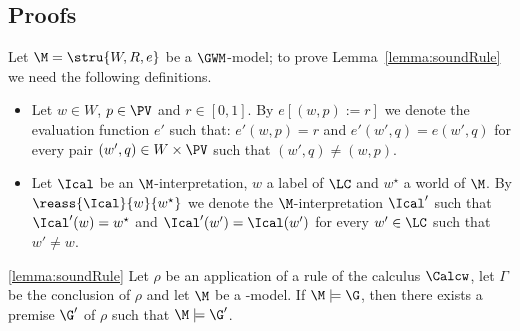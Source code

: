 \subsection{Proofs}\label{app:proofs}

Let $\M=\stru{W,R,e}$ be a $\GWM$-model;
to prove Lemma~\ref{lemma:soundRule} we need the following definitions.
\begin{itemize}
\item Let $w\in W$, $p\in\PV$ and
  $r\in[0,1]$. By  $e[(w,p):=r]$ we denote the evaluation function
  $e'$ such that: $e'(w,p)=r$ and $e'(w',q)=e(w',q)$ for every pair
  $(w',q)\in W\times\PV$ such that $(w',q)\neq(w,p)$.

\item Let $\Ical$ be an $\M$-interpretation,  $w$  a label of
  $\LC$ and $w^\star$ a world of $\M$.  By $\reass{\Ical}{w}{w^\star}$
  we denote the $\M$-interpretation $\Ical'$ such that $\Ical'(w) =
  w^\star$ and $\Ical'(w')= \Ical(w')$ for every $w'\in \LC$ such that
  $w'\neq w$.
\end{itemize}


\begin{lemmaref}{\ref{lemma:soundRule}}
  Let $\rho$ be an application of a rule of the calculus $\Calcw$, let
  $\Gamma$ be the conclusion of $\rho$ and let $\M$ be a \GWM-model.
  If $\M\models\G$, then there exists a premise $\G'$ of $\rho$ such
  that $\M\models\G'$.
\end{lemmaref}

